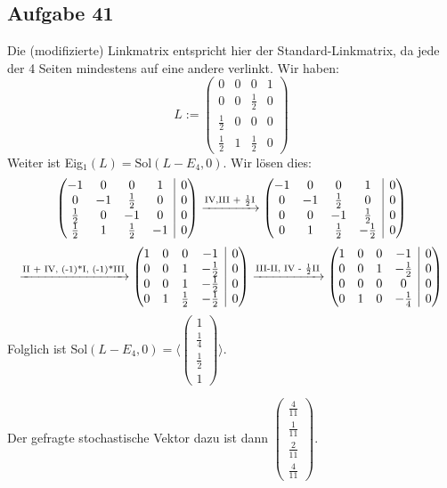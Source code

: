 \documentclass[a4paper,graphics,11pt]{article}
\newcommand{\aufgabe}[1]{\subsection*{Aufgabe #1}}
\begin{document}
\aufgabe{41}
Die (modifizierte) Linkmatrix entspricht hier der Standard-Linkmatrix, da jede
der 4 Seiten mindestens auf eine andere verlinkt.
Wir haben:
$$
    L := \begin{pmatrix}
        0 & 0 & 0 & 1\\
        0 & 0 & \frac{1}{2} & 0\\
        \frac{1}{2} & 0 & 0 & 0\\
        \frac{1}{2} & 1 & \frac{1}{2} & 0
    \end{pmatrix}
$$
Weiter ist Eig$_1(L) = \text{Sol}(L-E_4, 0)$. Wir lösen dies:
$$
    \begin{array}({@{}cccc|c@{}})
        -1 & 0 & 0 & 1 & 0\\
        0 & -1 & \frac{1}{2} & 0 & 0\\
        \frac{1}{2} & 0 & -1 & 0 & 0\\
        \frac{1}{2} & 1 & \frac{1}{2} & -1 & 0\\
    \end{array}
    \xrightarrow {\text{IV,III + $\frac{1}{2}$I}}
    \begin{array}({@{}cccc|c@{}})
        -1 & 0 & 0 & 1 & 0\\
        0 & -1 & \frac{1}{2} & 0 & 0\\
        0 & 0 & -1 & \frac{1}{2} & 0\\
        0 & 1 & \frac{1}{2} & -\frac{1}{2} & 0\\
    \end{array}
$$$$
    \xrightarrow {\text{II + IV, (-1)*I, (-1)*III}}
    \begin{array}({@{}cccc|c@{}})
        1 & 0 & 0 & -1 & 0\\
        0 & 0 & 1 & -\frac{1}{2} & 0\\
        0 & 0 & 1 & -\frac{1}{2} & 0\\
        0 & 1 & \frac{1}{2} & -\frac{1}{2} & 0\\
    \end{array}
    \xrightarrow {\text{III-II, IV - $\frac{1}{2}$II}}
    \begin{array}({@{}cccc|c@{}})
        1 & 0 & 0 & -1 & 0\\
        0 & 0 & 1 & -\frac{1}{2} & 0\\
        0 & 0 & 0 & 0 & 0\\
        0 & 1 & 0 & -\frac{1}{4} & 0\\
    \end{array}
$$
Folglich ist Sol$(L-E_4, 0) = \langle \begin{pmatrix}1\\\frac{1}{4}\\\frac{1}{2}\\1\end{pmatrix} \rangle$.

    Der gefragte stochastische Vektor dazu ist dann $\begin{pmatrix}\frac{4}{11}\\[2pt]\frac{1}{11}\\[2pt]\frac{2}{11}\\[2pt]\frac{4}{11}\end{pmatrix}$.
\end{document}
